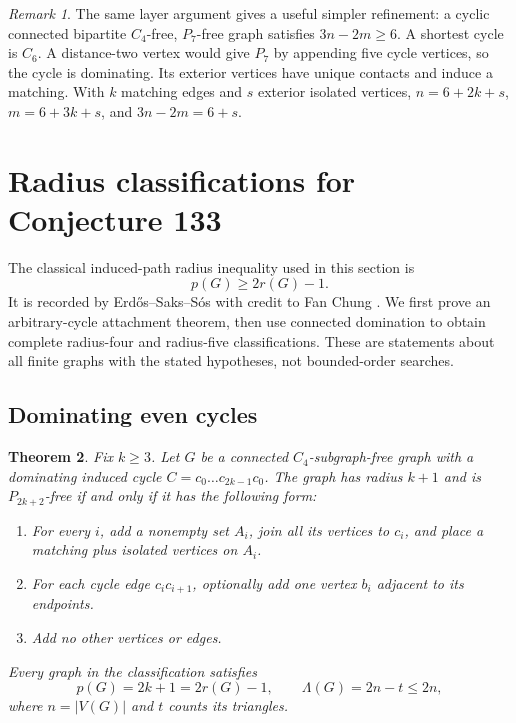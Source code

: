 \documentclass[11pt,a4paper]{article}
\newtheorem{theorem}{Theorem}[section]
\theoremstyle{definition}\newtheorem{definition}[theorem]{Definition}
\theoremstyle{remark}\newtheorem{remark}[theorem]{Remark}
\begin{document}
\begin{remark}
The same layer argument gives a useful simpler refinement: a cyclic
connected bipartite $C_4$-free, $P_7$-free graph satisfies $3n-2m\ge6$.
A shortest cycle is $C_6$. A distance-two vertex would give $P_7$ by
appending five cycle vertices, so the cycle is dominating. Its exterior
vertices have unique contacts and induce a matching. With $k$ matching
edges and $s$ exterior isolated vertices, $n=6+2k+s$, $m=6+3k+s$, and
$3n-2m=6+s$.
\end{remark}



\section{Radius classifications for Conjecture 133}
\label{sec:local-radius}
The classical induced-path radius inequality used in this section is
\begin{equation}\label{local:chung}
 p(G)\ge2r(G)-1.
\end{equation}
It is recorded by Erd\H{o}s--Saks--S\'os with credit to Fan Chung
\cite[Section II, pp.~64--65]{src:ess}. We first prove an arbitrary-cycle
attachment theorem, then use connected domination to obtain complete
radius-four and radius-five classifications. These are statements about
all finite graphs with the stated hypotheses, not bounded-order searches.
\subsection{Dominating even cycles}


\begin{theorem}\label{local16:thm:main}
Fix $k\ge3$. Let $G$ be a connected $C_4$-subgraph-free graph with a
dominating induced cycle $C=c_0\dots c_{2k-1}c_0$. The graph has radius
$k+1$ and is $P_{2k+2}$-free if and only if it has the following form:
\begin{enumerate}[label=\textup{(\roman*)}]
\item For every $i$, add a nonempty set $A_i$, join all its vertices to
$c_i$, and place a matching plus isolated vertices on $A_i$.
\item For each cycle edge $c_ic_{i+1}$, optionally add one vertex $b_i$
adjacent to its endpoints.
\item Add no other vertices or edges.
\end{enumerate}
Every graph in the classification satisfies
\[
 p(G)=2k+1=2r(G)-1,\qquad \Lambda(G)=2n-t\le2n,
\]
where $n=|V(G)|$ and $t$ counts its triangles.
\end{theorem}
\end{document}
